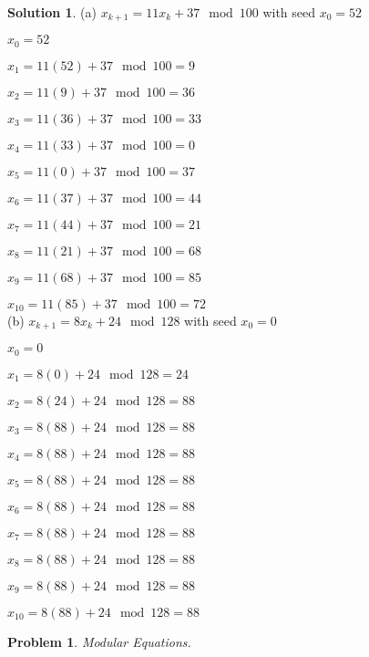 \documentclass{article}
\newtheorem{problem}{Problem}
\theoremstyle{definition}
\newtheorem*{solution}{Solution}
\begin{document}
\begin{solution}

(a) \(x_{k+1}=11x_k+37\mod 100\) with seed \(x_0=52\)

\(x_0=52\)

\(x_1=11(52)+37\mod 100=9\)

\(x_2=11(9)+37\mod 100=36\)

\(x_3=11(36)+37\mod 100=33\)

\(x_4=11(33)+37\mod 100=0\)

\(x_5=11(0)+37\mod 100=37\)

\(x_6=11(37)+37\mod 100=44\)

\(x_7=11(44)+37\mod 100=21\)

\(x_8=11(21)+37\mod 100=68\)

\(x_9=11(68)+37\mod 100=85\)

\(x_{10}=11(85)+37\mod 100=72\) \\

(b) \(x_{k+1}=8x_k+24\mod 128\) with seed \(x_0=0\)

\(x_0=0\)

\(x_1=8(0)+24\mod 128=24\)

\(x_2=8(24)+24\mod 128=88\)

\(x_3=8(88)+24\mod 128=88\)

\(x_4=8(88)+24\mod 128=88\)

\(x_5=8(88)+24\mod 128=88\)

\(x_6=8(88)+24\mod 128=88\)

\(x_7=8(88)+24\mod 128=88\)

\(x_8=8(88)+24\mod 128=88\)

\(x_9=8(88)+24\mod 128=88\)

\(x_{10}=8(88)+24\mod 128=88\)

\end{solution}

\begin{problem}

Modular Equations.

\end{problem}
\end{document}
